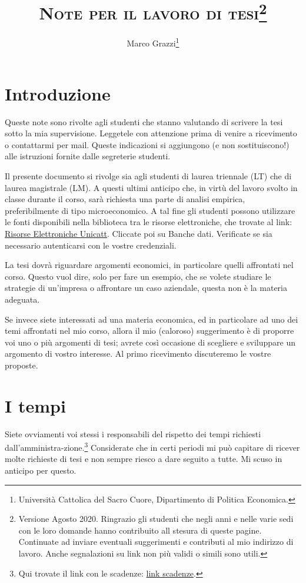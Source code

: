 \documentclass[12pt]{article}
\title{ \textsc{Note per il lavoro di tesi}\thanks{Versione Agosto
    2020. Ringrazio gli studenti che negli anni e nelle varie sedi con
    le loro domande hanno contribuito all stesura di queste
    pagine. Continuate ad inviare eventuali suggerimenti e contributi
    al mio indirizzo di lavoro. Anche segnalazioni su link non pi\`u
    validi o simili sono utili.}}
\author{Marco Grazzi\thanks{Universit\`a Cattolica del Sacro Cuore, Dipartimento di Politica Economica.}}
\date{\empty}
\begin{document}
\maketitle





\section{Introduzione}\label{sec:intro}

Queste note sono rivolte agli studenti che stanno valutando di
scrivere la tesi sotto la mia supervisione. Leggetele con attenzione
prima di venire a ricevimento o contattarmi per mail. Queste
indicazioni si aggiungono (e non sostituiscono!) alle istruzioni
fornite dalle segreterie studenti.

Il presente documento si rivolge sia agli studenti di laurea triennale
(LT) che di laurea magistrale (LM). A questi ultimi anticipo che, in
virt\`u del lavoro svolto in classe durante il corso, sar\`a richiesta
una parte di analisi empirica, preferibilmente di tipo
microeconomico. A tal fine gli studenti possono utilizzare le fonti
disponibili nella biblioteca tra le risorse elettroniche, che trovate
al link:
\href{https://biblioteche.unicatt.it/brescia-servizi-per-utenti-interni-ricerche-bibliografiche-e-banche-dati}{Risorse
  Elettroniche Unicatt}. Cliccate poi su Banche dati. Verificate se
sia necessario autenticarsi con le vostre credenziali.


La tesi dovr\`a riguardare argomenti economici, in particolare quelli
affrontati nel corso. Questo vuol dire, solo per fare un esempio, che
se volete studiare le strategie di un'impresa o affrontare un caso
aziendale, questa non \`e la materia adeguata.

Se invece siete interessati ad una materia economica, ed in
particolare ad uno dei temi affrontati nel mio corso, allora il mio
(caloroso) suggerimento \`e di proporre voi uno o pi\`u argomenti di
tesi; avrete cos\`i occasione di scegliere e sviluppare un argomento di
vostro interesse. Al primo ricevimento discuteremo le vostre proposte.



\section{I tempi}
Siete ovviamenti voi stessi i responsabili del rispetto dei tempi
richiesti dall'amministra-zione.\footnote{Qui trovate il link con le
  scadenze:
  \href{https://milano.unicatt.it/facolta/economia-informazioni-per-gli-studenti-esami-di-laurea-294}{link
    scadenze}. } Considerate che in certi periodi mi pu\`o capitare di
ricever molte richieste di tesi e non sempre riesco a dare seguito a
tutte. Mi scuso in anticipo per questo.
\end{document}
